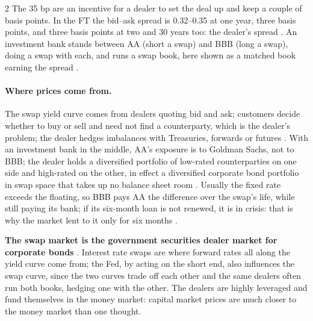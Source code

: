 \begin{paracol}{2}
The 35 bp are an incentive for a dealer to set the deal up and keep a couple of basis points. In the FT the bid--ask spread is 0.32--0.35 at one year, three basis
points, and three basis points at two and 30 years too: the dealer's spread . An investment bank
stands between AA (short a swap) and BBB (long a swap), doing a swap with each, and runs a swap book, here shown as a matched book earning the spread
.

\begin{nfigure}
\begin{taccts}
\quad
{}\quad
{}
\end{taccts}
\caption{The swap dealer's matched book .}\label{fig:irs-dealer}
\end{nfigure}

\paragraph{Where prices come from.} The swap yield curve comes from dealers quoting bid and ask; customers decide whether to buy or sell and need not find a
counterparty, which is the dealer's problem; the dealer hedges imbalances with Treasuries, forwards or futures . With an investment
bank in the middle, AA's exposure is to Goldman Sachs, not to BBB; the dealer holds a diversified portfolio of low-rated counterparties on one side and high-rated
on the other, in effect a diversified corporate bond portfolio in swap space that takes up no balance sheet room .
Usually the fixed rate exceeds the floating, so BBB pays AA the difference over the swap's life, while still paying its bank; if its six-month loan is not renewed,
it is in crisis: that is why the market lent to it only for six months .

\begin{keyformulas}
\textbf{The swap market is the government securities dealer market for corporate bonds} .
Interest rate swaps are where forward rates all along the yield curve come from; the Fed, by acting on the short end, also influences the swap curve, since the two
curves trade off each other and the same dealers often run both books, hedging one with the other. The dealers are highly leveraged and fund themselves in the
money market: capital market prices are much closer to the money market than one thought.
\end{keyformulas}


\end{paracol}

